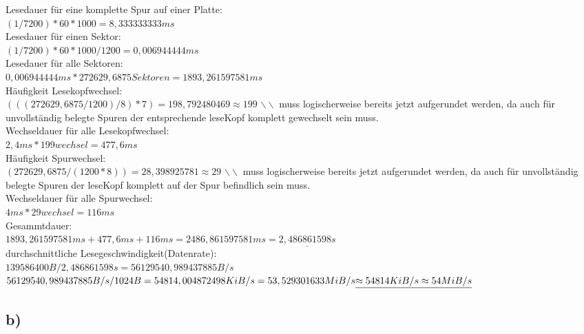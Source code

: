 \documentclass{ti2}
\begin{document}
Lesedauer für eine komplette Spur auf einer Platte:\\
$(1/7200)*60*1000 = 8,333333333ms$\\

Lesedauer für einen Sektor:\\
$(1/7200)*60*1000/1200 = 0,006944444ms$\\

Lesedauer für alle Sektoren:\\
$0,006944444ms*272629,6875Sektoren = 1893,261597581ms$\\

Häufigkeit Lesekopfwechsel:\\
$(((272629,6875/1200)/8)*7) = 198,792480469 \approx 199$ $\backslash  \backslash$ muss logischerweise bereits jetzt aufgerundet werden, da auch für unvollständig belegte Spuren der entsprechende leseKopf komplett gewechselt sein muss.\\

Wechseldauer für alle Lesekopfwechsel:\\
$2,4ms*199wechsel = 477,6ms$\\

Häufigkeit Spurwechsel:\\
$(272629,6875/(1200*8)) = 28,398925781 \approx 29$ $\backslash  \backslash$ muss logischerweise bereits jetzt aufgerundet werden, da auch für unvollständig belegte Spuren der leseKopf komplett auf der Spur befindlich sein muss.\\

Wechseldauer für alle Spurwechsel:\\
$4ms*29wechsel = 116ms$\\

Gesammtdauer:\\
$1893,261597581ms + 477,6ms + 116ms = 2486,861597581ms = \underline{2,486861598s}  $\\

durchschnittliche Lesegeschwindigkeit(Datenrate):\\
$139586400 B / 2,486861598s = 56129540,989437885 B/s$\\
$56129540,989437885 B/s / 1024B = 54814,004872498 KiB/s = 53,529301633 MiB/s\\ \underline{\approx 54814 KiB/s \approx 54 MiB/s}$\\

\subsection*{b)}
\end{document}
